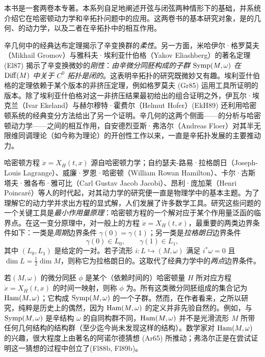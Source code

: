 
本书是一套两卷本专著。本系列自足地阐述开弦与闭弦两种情形下的基础\termFloerHomology，并系统介绍它在哈密顿动力学和辛拓扑问题中的应用。这两卷书的基本研究对象，是\termLagrangianSubmanifold{}的几何、\termHamiltonianDiffeomorphism{}的动力学，以及二者在辛拓扑中的相互作用。

辛几何中的经典达布定理揭示了辛变换群的\emph{柔性}。另一方面，米哈伊尔·格罗莫夫（Mikhail Gromov）与雅科夫·埃利亚什伯格（Yakov Eliashberg）的著名定理 (El87) 揭示了辛变换微妙的\emph{刚性}：\emph{由辛微分同胚构成的子群} $\operatorname{Symp}(M,\omega)$ \emph{在 $\operatorname{Diff}(M)$ 中关于 $C^0$ 拓扑是闭的}。这表明辛拓扑的研究既微妙又有趣。埃利亚什伯格的定理依赖于某个版本的非挤压定理，例如格罗莫夫 (Gr85) 运用\termPseudoholomorphicCurve{}工具所证明的版本。除了埃利亚什伯格对这一非挤压结果最初给出的组合证明之外，伊瓦尔·埃克兰（Ivar Ekeland）与赫尔穆特·霍费尔（Helmut Hofer）(EkH89) 还利用哈密顿系统的经典变分方法给出了另一个证明。辛几何的这两个侧面——\termPseudoholomorphicCurve{}的分析与哈密顿动力学——之间的相互作用，自安德烈亚斯·弗洛尔（Andreas Floer）对其半无限维同调理论（如今称为\emph{\termFloerHomology{}}理论）的开创性工作以来，一直是辛拓扑发展的主要推动力。

哈密顿方程 $\dot{x}=X_H(t,x)$ 源自哈密顿力学；自约瑟夫-路易·拉格朗日（Joseph-Louis Lagrange）、威廉·罗恩·哈密顿（William Rowan Hamilton）、卡尔·古斯塔夫·雅各布·雅可比（Carl Gustav Jacob Jacobi）、昂利·庞加莱（Henri Poincaré）等人的时代起，对其动力学的研究便一直是物理学中的基本主题。为了理解它的动力学并求出方程的显式解，人们发展了许多数学工具。研究这些问题的一个关键工具是\emph{最小作用量原理}：哈密顿方程的一个解对应于某个作用量泛函的临界点。在这一变分原理中，对一般\termSymplecticManifold{}上的方程 $\dot{x}=X_H(t,x)$，最重要的两类边界条件如下：一类是\emph{周期}边界条件 $\gamma(0)=\gamma(1)$；另一类是\emph{拉格朗日}边界条件
\[
  \gamma(0)\in L_0,\qquad \gamma(1)\in L_1,
\]
其中 $(L_0,L_1)$ 是给定的一对\termLagrangianSubmanifold。若子流形 $i:L\hookrightarrow(M,\omega)$ 满足 $i^*\omega=0$ 且 $\dim L=\frac12\dim M$，则称它为拉格朗日的。这取代了经典力学中的\emph{两点}边界条件。

若\termSymplecticManifold $(M,\omega)$ 的微分同胚 $\phi$ 是某个（依赖时间的）哈密顿量 $H$ 所对应方程 $\dot{x}=X_H(t,x)$ 的时间一映射，则称 $\phi$ 为\termHamiltonianDiffeomorphism。所有这类微分同胚组成的集合记为 $\operatorname{Ham}(M,\omega)$；它构成 $\operatorname{Symp}(M,\omega)$ 的一个子群。然而，在作者看来，之所以研究\termHamiltonianDiffeomorphism，纯粹是历史上的偶然，因为 $\operatorname{Ham}(M,\omega)$ 的定义并非先验自然的。例如，与 $\operatorname{Symp}(M,\omega)$ 是辛结构 $\omega$ 的自同构群不同，$\operatorname{Ham}(M,\omega)$ 并不是光滑流形 $M$ 所带任何几何结构的结构群（至少迄今尚未发现这样的结构）。数学家对 $\operatorname{Ham}(M,\omega)$ 的兴趣，很大程度上由著名的阿诺尔德猜想 (Ar65) 所推动；弗洛尔正是在尝试证明这一猜想的过程中创立了\termFloerHomology (Fl88b, Fl89b)。

